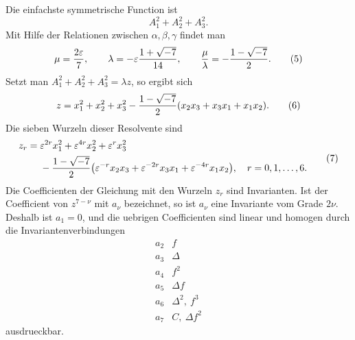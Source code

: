 \documentclass[11pt]{article}
\providecommand{\eps}{\varepsilon}
\providecommand{\eps}{\varepsilon}
\begin{document}
Die einfachste symmetrische Function ist
\begin{equation}
A_1^2+A_2^2+A_3^2.
\tag{4}
\end{equation}
Mit Hilfe der Relationen zwischen \(\alpha,\beta,\gamma\) findet man
\begin{equation}
\mu={2\eps\over7},\qquad
\lambda=-\eps {1+\sqrt{-7}\over14},\qquad {\mu\over\lambda}=-{1-\sqrt{-7}\over2}.
\tag{5}
\end{equation}
Setzt man \(A_1^2+A_2^2+A_3^2=\lambda z\), so ergibt sich
\begin{equation}
z=x_1^2+x_2^2+x_3^2-{1-\sqrt{-7}\over2}(x_2x_3+x_3x_1+x_1x_2).
\tag{6}
\end{equation}
Die sieben Wurzeln dieser Resolvente sind
\begin{equation}
\begin{aligned}
z_r={}&\eps^{2r}x_1^2+\eps^{4r}x_2^2+\eps^rx_3^2\\
&-{1-\sqrt{-7}\over2}\bigl(\eps^{-r}x_2x_3+\eps^{-2r}x_3x_1+\eps^{-4r}x_1x_2\bigr),\quad r=0,1,\ldots,6.
\end{aligned}
\tag{7}
\end{equation}
Die Coefficienten der Gleichung mit den Wurzeln \(z_r\) sind Invarianten. Ist der Coefficient von \(z^{7-\nu}\) mit \(a_\nu\) bezeichnet, so ist \(a_\nu\) eine Invariante vom Grade \(2\nu\). Deshalb ist \(a_1=0\), und die uebrigen Coefficienten sind linear und homogen durch die Invariantenverbindungen
\begin{equation}
\begin{array}{c|c}
a_2&f\\
a_3&\Delta\\
a_4&f^2\\
a_5&\Delta f\\
a_6&\Delta^2,\ f^3\\
a_7&C,\ \Delta f^2
\end{array}
\tag{8}
\end{equation}
ausdrueckbar.
\end{document}
